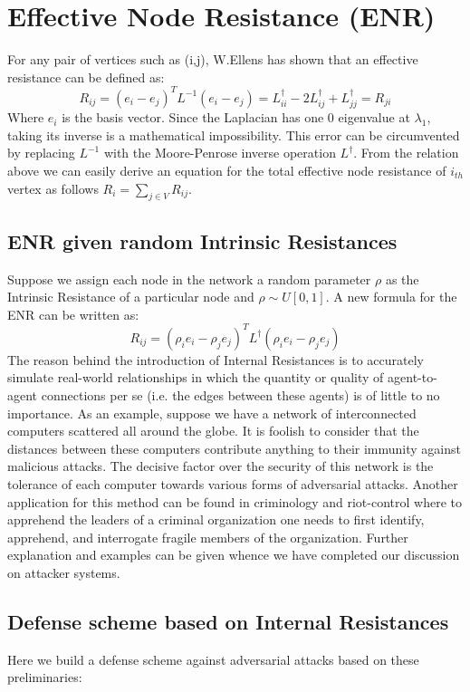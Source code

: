 \documentclass{article}
\begin{document}
	\section{Effective Node Resistance (ENR)}
	For any pair of vertices such as (i,j), W.Ellens \cite{ellens2013graph} has shown that an effective resistance can be defined as:
	\begin{equation}
		R_{ij} = (e_i-e_j)^T  L^{-1} (e_i-e_j) = L_{ii}^{\dag} -2L_{ij}^{\dag} + L_{jj}^{\dag}= R_{ji}
	\end{equation}
	Where $e_i$ is the basis vector. Since the Laplacian has one 0 eigenvalue at $\lambda_1$, taking its inverse is a mathematical impossibility. This error can be circumvented by replacing $L^{-1}$ with the Moore-Penrose inverse operation $L^\dag$. From the relation above we can easily derive an equation for the total effective node resistance of $i_{th}$ vertex as follows $R_i = \sum_{j\in V}R_{ij}$.
	
	\subsection{ENR given random Intrinsic Resistances}
	Suppose we assign each node in the network a random parameter $\rho$ as the Intrinsic Resistance of a particular node and $\rho \sim U[0,1]$. A new formula for the ENR can be written as:
	\begin{equation}
		R_{ij} = (\rho_i e_i - \rho_j e_j)^T L^{\dag} (\rho_i e_i - \rho_j e_j)
	\end{equation}
	The reason behind the introduction of Internal Resistances is to accurately simulate real-world relationships in which the quantity or quality of agent-to-agent connections per se (i.e. the edges between these agents) is of little to no importance. As an example, suppose we have a network of interconnected computers scattered all around the globe. It is foolish to consider that the distances between these computers contribute anything to their immunity against malicious attacks. The decisive factor over the security of this network is the tolerance of each computer towards various forms of adversarial attacks. Another application for this method can be found in criminology and riot-control where to apprehend the leaders of a criminal organization one needs to first identify, apprehend, and interrogate fragile members of the organization. Further explanation and examples can be given whence we have completed our discussion on attacker systems.
	\subsection{Defense scheme based on Internal Resistances}
	Here we build a defense scheme against adversarial attacks based on these preliminaries:
	
\end{document}
